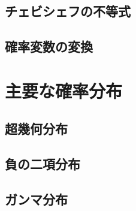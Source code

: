 \subsection{チェビシェフの不等式}

\subsection{確率変数の変換}

\section{主要な確率分布}
\label{sec:stat-distributions}


\subsection{超幾何分布}

\subsection{負の二項分布}

\subsection{ガンマ分布}

